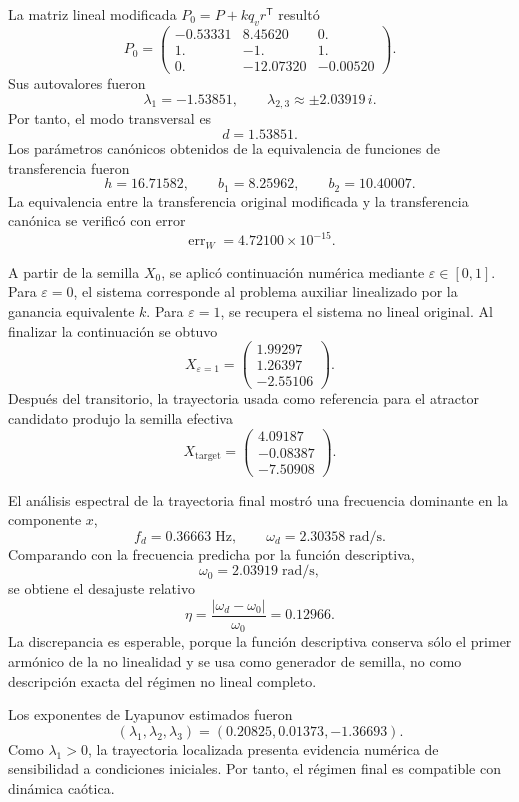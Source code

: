 \documentclass[journal]{IEEEtran}
\begin{document}
La matriz lineal modificada \(P_0=P+kq_vr^\mathsf{T}\) resultó
\[
P_0=
\begin{pmatrix}
-0.53331 & 8.45620 & 0.\\
1. & -1. & 1.\\
0. & -12.07320 & -0.00520
\end{pmatrix}.
\]
Sus autovalores fueron
\[
\lambda_1=-1.53851,
\qquad
\lambda_{2,3}\approx \pm 2.03919\,i.
\]
Por tanto, el modo transversal es
\[
d=1.53851.
\]
Los parámetros canónicos obtenidos de la equivalencia de funciones de
transferencia fueron
\[
h=16.71582,
\qquad
b_1=8.25962,
\qquad
b_2=10.40007.
\]
La equivalencia entre la transferencia original modificada y la transferencia
canónica se verificó con error
\[
\operatorname{err}_{W}=4.72100\times10^{-15}.
\]

A partir de la semilla \(X_0\), se aplicó continuación numérica mediante
\(\varepsilon\in[0,1]\). Para \(\varepsilon=0\), el sistema corresponde al
problema auxiliar linealizado por la ganancia equivalente \(k\). Para
\(\varepsilon=1\), se recupera el sistema no lineal original. Al finalizar la
continuación se obtuvo
\[
X_{\varepsilon=1}=
\begin{pmatrix}
1.99297\\
1.26397\\
-2.55106
\end{pmatrix}.
\]
Después del transitorio, la trayectoria usada como referencia para el atractor
candidato produjo la semilla efectiva
\[
X_{\mathrm{target}}=
\begin{pmatrix}
4.09187\\
-0.08387\\
-7.50908
\end{pmatrix}.
\]

El análisis espectral de la trayectoria final mostró una frecuencia dominante
en la componente \(x\),
\[
f_d=0.36663\;\mathrm{Hz},
\qquad
\omega_d=2.30358\;\mathrm{rad/s}.
\]
Comparando con la frecuencia predicha por la función descriptiva,
\[
\omega_0=2.03919\;\mathrm{rad/s},
\]
se obtiene el desajuste relativo
\[
\eta=
\frac{|\omega_d-\omega_0|}{\omega_0}
=
0.12966.
\]
La discrepancia es esperable, porque la función descriptiva conserva sólo el
primer armónico de la no linealidad y se usa como generador de semilla, no
como descripción exacta del régimen no lineal completo.

Los exponentes de Lyapunov estimados fueron
\[
(\lambda_1,\lambda_2,\lambda_3)
=
(0.20825,0.01373,-1.36693).
\]
Como \(\lambda_1>0\), la trayectoria localizada presenta evidencia numérica
de sensibilidad a condiciones iniciales. Por tanto, el régimen final es
compatible con dinámica caótica.
\end{document}
